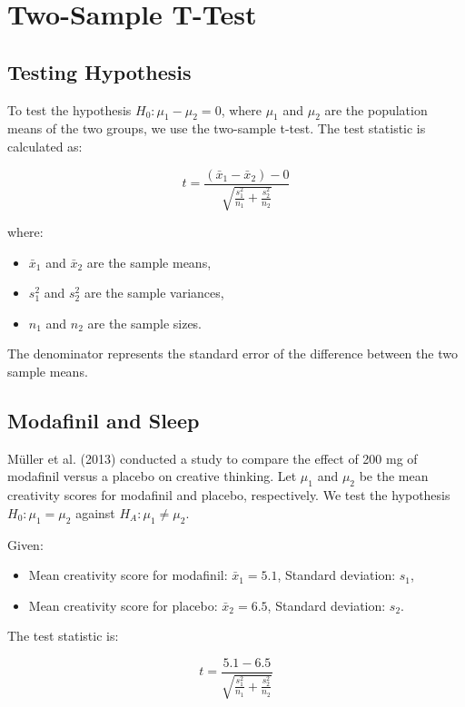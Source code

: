 \documentclass{article}
\begin{document}
\section{Two-Sample T-Test}

\subsection{Testing Hypothesis}

To test the hypothesis \( H_0: \mu_1 - \mu_2 = 0 \), where \( \mu_1 \) and \( \mu_2 \) are the population means of the two groups, we use the two-sample t-test. The test statistic is calculated as:

\[
t = \frac{(\bar{x}_1 - \bar{x}_2) - 0}{\sqrt{\frac{s_1^2}{n_1} + \frac{s_2^2}{n_2}}}
\]

where:
\begin{itemize}
    \item \( \bar{x}_1 \) and \( \bar{x}_2 \) are the sample means,
    \item \( s_1^2 \) and \( s_2^2 \) are the sample variances,
    \item \( n_1 \) and \( n_2 \) are the sample sizes.
\end{itemize}

The denominator represents the standard error of the difference between the two sample means.

\subsection{Modafinil and Sleep}

Müller et al. (2013) conducted a study to compare the effect of 200 mg of modafinil versus a placebo on creative thinking. Let \( \mu_1 \) and \( \mu_2 \) be the mean creativity scores for modafinil and placebo, respectively. We test the hypothesis \( H_0: \mu_1 = \mu_2 \) against \( H_A: \mu_1 \ne \mu_2 \).

Given:
\begin{itemize}
    \item Mean creativity score for modafinil: \( \bar{x}_1 = 5.1 \), Standard deviation: \( s_1 \),
    \item Mean creativity score for placebo: \( \bar{x}_2 = 6.5 \), Standard deviation: \( s_2 \).
\end{itemize}

The test statistic is:

\[
t = \frac{5.1 - 6.5}{\sqrt{\frac{s_1^2}{n_1} + \frac{s_2^2}{n_2}}}
\]
\end{document}
